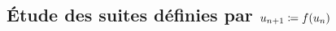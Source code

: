 \documentclass{magnoliaold}
\begin{document}
\subsection{Étude des suites définies par $u_{n+1}\coloneqq f(u_n)$}


\end{document}
